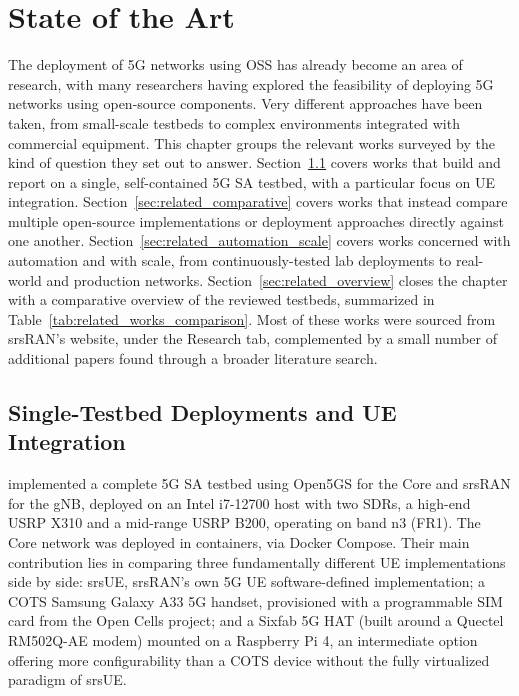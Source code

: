 %

\chapter{State of the Art}
\label{cha:state-of-the-art}

The deployment of 5G networks using \gls{OSS} has already become an area of research, with many researchers having explored the feasibility of deploying 5G networks using open-source components. Very different approaches have been taken, from small-scale testbeds to complex environments integrated with commercial equipment. This chapter groups the relevant works surveyed by the kind of question they set out to answer. Section~\ref{sec:related_single_testbed} covers works that build and report on a single, self-contained 5G \gls{SA} testbed, with a particular focus on \gls{UE} integration. Section~\ref{sec:related_comparative} covers works that instead compare multiple open-source implementations or deployment approaches directly against one another. Section~\ref{sec:related_automation_scale} covers works concerned with automation and with scale, from continuously-tested lab deployments to real-world and production networks. Section~\ref{sec:related_overview} closes the chapter with a comparative overview of the reviewed testbeds, summarized in Table~\ref{tab:related_works_comparison}. Most of these works were sourced from srsRAN's website, under the Research tab, complemented by a small number of additional papers found through a broader literature search.

\section{Single-Testbed Deployments and UE Integration}
\label{sec:related_single_testbed}

\textcite{tio2025exploring5g} implemented a complete 5G \gls{SA} testbed using Open5GS for the Core and srsRAN for the \gls{gNB}, deployed on an Intel i7-12700 host with two \glspl{SDR}, a high-end \gls{USRP} X310 and a mid-range USRP B200, operating on band n3 (FR1). The Core network was deployed in containers, via Docker Compose. Their main contribution lies in comparing three fundamentally different \gls{UE} implementations side by side: srsUE, srsRAN's own 5G \gls{UE} software-defined implementation; a \gls{COTS} Samsung Galaxy A33 5G handset, provisioned with a programmable SIM card from the Open Cells project; and a Sixfab 5G HAT (built around a Quectel RM502Q-AE modem) mounted on a Raspberry Pi 4, an intermediate option offering more configurability than a \gls{COTS} device without the fully virtualized paradigm of srsUE.

